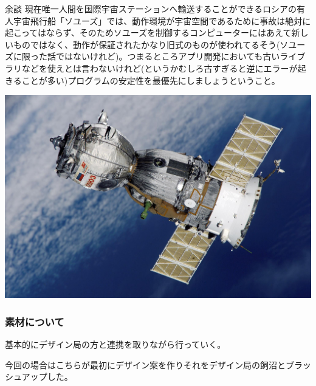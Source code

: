 \documentclass[dvipdfmx,jb5]{jarticle}
\begin{document}
 \begin{itembox}[l]{余談}
 現在唯一人間を国際宇宙ステーションへ輸送することができるロシアの有人宇宙飛行船「ソユーズ」では、動作環境が宇宙空間であるために事故は絶対に起こってはならず、そのためソユーズを制御するコンピューターにはあえて新しいものではなく、動作が保証されたかなり旧式のものが使われてるそう(ソユーズに限った話ではないけれど)。つまるところアプリ開発においても古いライブラリなどを使えとは言わないけれど(というかむしろ古すぎると逆にエラーが起きることが多い)プログラムの安定性を最優先にしましょうということ。\par
 \begin{center}
 \includegraphics[scale = 0.1]{assets/soyuz.jpg}
 \end{center}
 \end{itembox}
  \subsubsection{素材について}
 基本的にデザイン局の方と連携を取りながら行っていく。\par
今回の場合はこちらが最初にデザイン案を作りそれをデザイン局の飼沼とブラッシュアップした。\par
\end{document}
